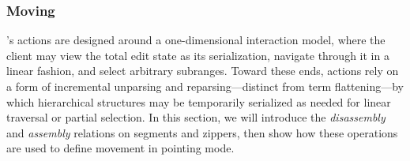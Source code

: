 

\subsubsection{Moving} \label{sec:moving}

\ty's actions are designed around
a one-dimensional interaction model, where the client may
view the total edit state as its serialization, navigate through it
in a linear fashion, and select arbitrary subranges.
Toward these ends, actions rely
on a form of incremental unparsing and reparsing---distinct
from term flattening---by which
hierarchical structures may be temporarily serialized
as needed for linear traversal or partial selection.
In this section, we will introduce the
\emph{disassembly} and \emph{assembly} relations on segments
and zippers, then show how these operations are used
to define movement in pointing mode.










